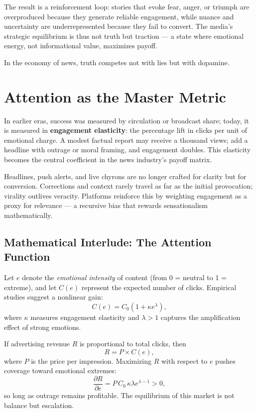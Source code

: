 \documentclass[12pt,twoside]{book}
\begin{document}
The result is a reinforcement loop: stories that evoke fear, anger, or triumph are overproduced because they generate reliable engagement, while nuance and uncertainty are underrepresented because they fail to convert.  
The media’s strategic equilibrium is thus not truth but traction --- a state where emotional energy, not informational value, maximizes payoff.  \\

\begin{keyidea}
In the economy of news, truth competes not with lies but with dopamine.
\end{keyidea}

\section{Attention as the Master Metric}

In earlier eras, success was measured by circulation or broadcast share; today, it is measured in \textbf{engagement elasticity}: the percentage lift in clicks per unit of emotional charge.  
A modest factual report may receive a thousand views; add a headline with outrage or moral framing, and engagement doubles.  
This elasticity becomes the central coefficient in the news industry’s payoff matrix.

Headlines, push alerts, and live chyrons are no longer crafted for clarity but for conversion.  
Corrections and context rarely travel as far as the initial provocation; virality outlives veracity.  
Platforms reinforce this by weighting engagement as a proxy for relevance --- a recursive bias that rewards sensationalism mathematically.  

\subsection*{Mathematical Interlude: The Attention Function}

Let \(e\) denote the \textit{emotional intensity} of content (from 0 = neutral to 1 = extreme), and let \(C(e)\) represent the expected number of clicks.  
Empirical studies suggest a nonlinear gain:
\[
C(e) = C_0(1 + \kappa e^\lambda),
\]
where \(\kappa\) measures engagement elasticity and \(\lambda > 1\) captures the amplification effect of strong emotions.  

If advertising revenue \(R\) is proportional to total clicks, then
\[
R = P \times C(e),
\]
where \(P\) is the price per impression.  
Maximizing \(R\) with respect to \(e\) pushes coverage toward emotional extremes:
\[
\frac{\partial R}{\partial e} = P\,C_0\,\kappa\lambda e^{\lambda - 1} > 0,
\]
so long as outrage remains profitable.  
The equilibrium of this market is not balance but escalation.\\
\end{document}
